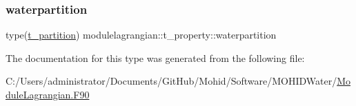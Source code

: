 \mbox{\label{structmodulelagrangian_1_1t__property_a13753fa031abebf088bdf3dfc2205287}} 
\subsubsection{\texorpdfstring{waterpartition}{waterpartition}}
{\footnotesize\ttfamily type(\mbox{\hyperlink{structmodulelagrangian_1_1t__partition}{t\+\_\+partition}}) modulelagrangian\+::t\+\_\+property\+::waterpartition\hspace{0.3cm}{\ttfamily [private]}}



The documentation for this type was generated from the following file\+:\begin{DoxyCompactItemize}
\item 
C\+:/\+Users/administrator/\+Documents/\+Git\+Hub/\+Mohid/\+Software/\+M\+O\+H\+I\+D\+Water/\mbox{\hyperlink{_module_lagrangian_8_f90}{Module\+Lagrangian.\+F90}}\end{DoxyCompactItemize}

